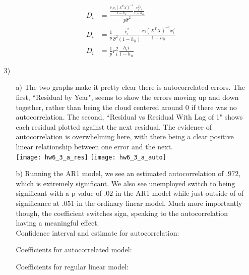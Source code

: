 \documentclass[11pt]{article}
\theoremstyle{definition}
\begin{document}
\begin{itemize}
\begin{itemize}
\begin{align*}
                    D_i &= \frac{\frac{\hat e_ix_i(X^TX)^{-1}}{1-h_{ii}}\frac{x_i^T\hat e_i}{1-h_{ii}}}{p\hat\sigma^2} \\
                    D_i &= \frac{1}{p}\frac{\hat e_i^2}{\hat\sigma^2(1-h_{ii})}\frac{x_i(X^TX)^{-1}x_i^T}{1-h_{ii}} \\
                    D_i &= \frac{1}{p} r_i^2 \frac{h_ii}{1-h_{ii}} 
                \end{align*}
        \end{itemize}
    \item[3)]
        \begin{itemize}
            \item[a)]
                The two graphs make it pretty clear there is autocorrelated errors. The first, ``Residual by Year", seems to show the errors moving up and down together, rather than being the cloud centered around $0$ if there was no autocorrelation. The second, ``Residual vs Residual With Lag of 1" shows each residual plotted against the next residual. The evidence of autocorrelation is overwhelming here, with there being a clear positive linear relationship between one error and the next. \\
                \texttt{[image: hw6\_3\_a\_res]} 
                \texttt{[image: hw6\_3\_a\_auto]}  \\
            \item[b)]
                Running the AR1 model, we see an estimated autocorrelation of $.972$, which is extremely significant. We also see unemployed switch to being significant with a p-value of $.02$ in the AR1 model while just outside of of significance at $.051$ in the ordinary linear model. Much more importantly though, the coefficient switches sign, speaking to the autocorrelation having a meaningful effect.\\
                Confidence interval and estimate for autocorrelation: \\
                \FloatBarrier
                 
                \FloatBarrier

                Coefficients for autocorrelated model: \\
                \FloatBarrier
                
                \FloatBarrier

                Coefficients for regular linear model: \\
                \FloatBarrier
                
                \FloatBarrier


\end{itemize}
\end{itemize}
\end{document}
